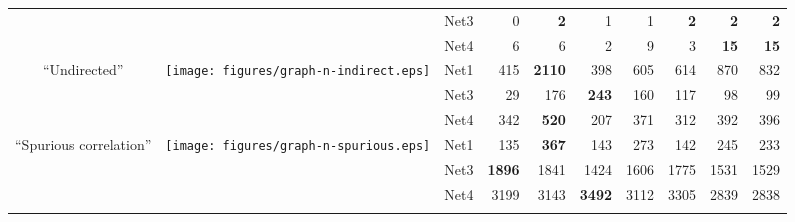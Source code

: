 \begin{table*}[t]
\begin{adjustbox}{max width=\textwidth}
\begin{tabular}{cccrrrrrrr}
  &   & Net3 & 0 & \textbf{2} & 1 & 1 & \textbf{2} & \textbf{2} & \textbf{2} \\
  &   & Net4 & 6 & 6 & 2 & 9 & 3 & \textbf{15} & \textbf{15} \\
\midrule
\multirow{3}{*}{``Undirected''} & \multirow{3}{*}{\texttt{[image: figures/graph-n-indirect.eps]}} & Net1 & 415 & \textbf{2110} & 398 & 605 & 614 & 870 & 832 \\
  &   & Net3 & 29 & 176 & \textbf{243} & 160 & 117 & 98 & 99 \\
  &   & Net4 & 342 & \textbf{520} & 207 & 371 & 312 & 392 & 396 \\
\midrule
\multirow{3}{*}{``Spurious correlation''} & \multirow{3}{*}{\texttt{[image: figures/graph-n-spurious.eps]}} & Net1 & 135 & \textbf{367} & 143 & 273 & 142 & 245 & 233 \\
  &   & Net3 & \textbf{1896} & 1841 & 1424 & 1606 & 1775 & 1531 & 1529 \\
  &   & Net4 & 3199 & 3143 & \textbf{3492} & 3112 & 3305 & 2839 & 2838 \\
\midrule
\botrule
\end{tabular}\end{adjustbox}{}
\end{table*}
